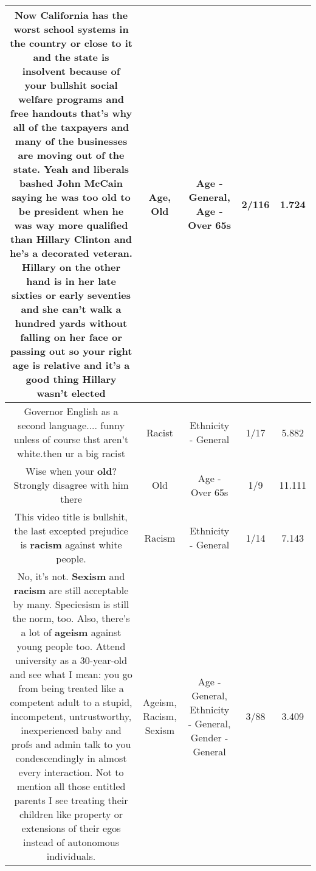\documentclass[11pt]{article}
\newlength\mylength
\begin{document}
\begin{center}
\begin{longtable}{|C{.65\mylength}|C{.30\mylength}|C{.12\mylength}|C{.12\mylength}|C{.12\mylength}|}
  \small Now California has the worst school systems in the country or close to it and the state is insolvent because of your bullshit social welfare programs and free handouts that's why all of the taxpayers and many of the businesses are moving out of the state. Yeah and liberals bashed John McCain saying he was too \textbf{old} to be president when he was way more qualified than Hillary Clinton and he's a decorated veteran. Hillary on the other hand is in her late sixties or early seventies and she can't walk a hundred yards without falling on her face or passing out so your right \textbf{age} is relative and it's a good thing Hillary wasn't elected\normalsize   & Age, Old & Age - General, Age - Over 65s & 2/116 & 1.724 \\  \hline
  \small Governor English as a second language.... funny unless of course thst aren't white.then ur a big racist\normalsize   & Racist & Ethnicity - General & 1/17 & 5.882 \\  \hline
  \small Wise when your \textbf{old}? Strongly disagree with him there\normalsize   & Old & Age - Over 65s & 1/9 & 11.111 \\  \hline
  \small This video title is bullshit, the last excepted prejudice is \textbf{racism} against white people.\normalsize   & Racism & Ethnicity - General & 1/14 & 7.143 \\  \hline
  \small No, it's not. \textbf{Sexism} and \textbf{racism} are still acceptable by many. Speciesism is still the norm, too. Also, there's a lot of \textbf{ageism} against young people too. Attend university as a 30-year-old and see what I mean: you go from being treated like a competent adult to a  stupid, incompetent, untrustworthy, inexperienced baby and profs and admin talk to you condescendingly in almost every interaction. Not to mention all those entitled parents I see treating their children like property or extensions of their egos instead of autonomous individuals.\normalsize   & Ageism, Racism, Sexism & Age - General, Ethnicity - General, Gender - General & 3/88 & 3.409 \\  \hline

\end{longtable}
\end{center}
\end{document}
